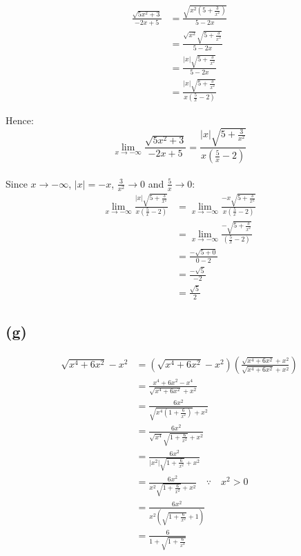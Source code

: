 \documentclass[11pt]{article}
\begin{document}
\begin{align*}
\frac{\sqrt{5x^2 + 3}}{-2x + 5} &= \frac{\sqrt{x^2 \left(5 + \frac{3}{x^2} \right)}}{5 - 2x} \\
&= \frac{\sqrt{x^2} \sqrt{5 + \frac{3}{x^2}}}{5 - 2x} \\
&= \frac{|x| \sqrt{5 + \frac{3}{x^2}}}{5 - 2x} \\
&= \frac{|x| \sqrt{5 + \frac{3}{x^2}}}{x \left(\frac{5}{x} - 2 \right)}
\end{align*}

Hence:
\[\lim_{x \rightarrow -\infty} \frac{\sqrt{5x^2 + 3}}{-2x + 5} = \frac{|x| \sqrt{5 + \frac{3}{x^2}}}{x \left(\frac{5}{x} - 2 \right)}\]
\\[0pt]

Since \(x \rightarrow -\infty\), \(|x| = -x\), \(\frac{3}{x^2} \rightarrow 0\) and \(\frac{5}{x} \rightarrow 0\):
\begin{align*}
\lim_{x \rightarrow -\infty} \frac{|x| \sqrt{5 + \frac{3}{x^2}}}{x \left( \frac{5}{x} - 2 \right)} &= \lim_{x \rightarrow -\infty} \frac{-x \sqrt{5 + \frac{3}{x^2}}}{x \left(\frac{5}{x} - 2 \right)} \\
&= \lim_{x \rightarrow -\infty} \frac{-\sqrt{5 + \frac{3}{x^2}}}{\left(\frac{5}{x} - 2 \right)} \\
&= \frac{-\sqrt{5 + 0}}{0 - 2} \\
&= \frac{-\sqrt{5}}{-2} \\
&= \frac{\sqrt{5}}{2}
\end{align*}

\subsection{(g)}
\label{sec:org2b2e157}

\begin{align*}
\sqrt{x^4 + 6x^2} - x^2 &= (\sqrt{x^4 + 6x^2} - x^2) \left(\frac{\sqrt{x^4 + 6x^2} + x^2}{\sqrt{x^4 + 6x^2} + x^2} \right) \\
&= \frac{x^4 + 6x^2 - x^4}{\sqrt{x^4 + 6x^2} + x^2} \\
&= \frac{6x^2}{\sqrt{x^4 \left( 1 + \frac{6}{x^2}\right)} + x^2} \\
&= \frac{6x^2}{\sqrt{x^4} \sqrt{1 + \frac{6}{x^2}} + x^2} \\
&= \frac{6x^2}{|x^2| \sqrt{1 + \frac{6}{x^2}} + x^2} \\
&= \frac{6x^2}{x^2 \sqrt{1 + \frac{6}{x^2}} + x^2} \quad \because \quad x^2 > 0 \\
&= \frac{6x^2}{x^2(\sqrt{1 + \frac{6}{x^2}} + 1)} \\
&= \frac{6}{1 + \sqrt{1 + \frac{6}{x^2}}}
\end{align*}
\end{document}
